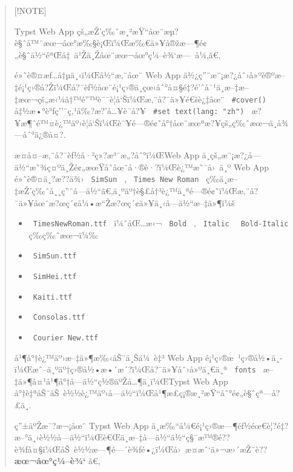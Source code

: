 

\begin{quote}
{[}!NOTE{]}

Typst Web App
çš„æŽ'ç‰ˆæ¸²æŸ``åœ¨æµ?è§ˆå™¨æœ¬åœ°æ‰§è¡Œï¼Œæ‰€ä»¥å®žæ---¶é¢„è§ˆä½``éªŒå‡~ä¹Žä¸Žåœ¨æœ¬åœ°ç¼--è¾`æ---~å¼‚ã€‚

é»˜è®¤æƒ\ldots å†µä¸‹ï¼Œå½``æ‚¨åœ¨ Web App
ä½¿ç''¨æ¨¡æ?¿åˆ›å»ºè®ºæ--‡é¡¹ç›®å?Žï¼Œå?¯èƒ½åœ¨é¡¹ç›®ä¸­çœ‹åˆ°å¤§é‡?é'ˆå¯¹ä¸­æ--‡æ--‡æœ¬çš„æ‹¼å†™é''™è¯¯è­¦å`Šï¼Œæ‚¨å?¯ä»¥é€šè¿‡åœ¨
\texttt{\ \#cover()\ } å‡½æ•°è°ƒç''¨ç‚¹å‰?æ?'å\ldots¥è¯­å?¥
\texttt{\ \#set\ text(lang:\ "zh")\ }
æ?¥æ¶ˆé™¤è¿™äº›è­¦å`Šï¼Œè¯¥é---®é¢˜å°†åœ¨æœªæ?¥çš„ç‰ˆæœ¬ä¸­å¾---åˆ°ä¿®å¤?.

æ­¤å¤--æ‚¨å?¯èƒ½å·²ç»?æ³¨æ„?åˆ°ï¼ŒWeb App
ä¸­çš„æ¨¡æ?¿å­---ä½``æ˜¾ç¤ºä¸Žé¢„æœŸå­˜åœ¨å·®è·?ï¼Œè¿™æ˜¯å›~ä¸º Web App
é»˜è®¤ä¸?æ??ä¾› \texttt{\ SimSun\ } , \texttt{\ Times\ New\ Roman\ }
ç­‰ä¸­æ--‡æŽ'ç‰ˆå¸¸ç''¨å­---ä½``ã€‚ä¸ºäº†è§£å†³è¿™ä¸ªé---®é¢˜ï¼Œæ‚¨å?¯ä»¥åœ¨æ?œç´¢å¼•æ``Žæ?œç´¢ä»¥ä¸‹å­---ä½``æ--‡ä»¶ï¼š

\begin{itemize}
\tightlist
\item
  \texttt{\ TimesNewRoman.ttf\ } ï¼ˆåŒ\ldots æ‹¬ \texttt{\ Bold\ } ,
  \texttt{\ Italic\ } \texttt{\ Bold-Italic\ } ç­‰ç‰ˆæœ¬ï¼‰
\item
  \texttt{\ SimSun.ttf\ }
\item
  \texttt{\ SimHei.ttf\ }
\item
  \texttt{\ Kaiti.ttf\ }
\item
  \texttt{\ Consolas.ttf\ }
\item
  \texttt{\ Courier\ New.ttf\ }
\end{itemize}

å¹¶å°†è¿™äº›æ--‡ä»¶æ‰‹åŠ¨ä¸Šä¼~è‡³ Web App
é¡¹ç›®æ~¹ç›®å½•ä¸­ï¼Œæˆ--ä¸ºäº†ç›®å½•æ•´æ´?ï¼Œå?¯ä»¥åˆ›å»ºä¸€ä¸ª
\texttt{\ fonts\ } æ--‡ä»¶å¤¹å¹¶å°†å­---ä½``ç½®äºŽå\ldots¶ä¸­ï¼ŒTypst Web
App å°†è‡ªåŠ¨åŠ~è½½è¿™äº›å­---ä½``ï¼Œå¹¶æ­£ç¡®æ¸²æŸ``åˆ°é¢„è§ˆçª---å?£ä¸­.

ç''±äºŽæ¯?æ¬¡åœ¨ Typst Web App
ä¸­æ‰``å¼€é¡¹ç›®æ---¶éƒ½éœ€è¦?é‡?æ--°ä¸‹è½½å­---ä½``ï¼Œè€Œä¸­æ--‡å­---ä½``ä½``ç§¯æ™®é??è¾ƒå¤§ï¼ŒåŠ~è½½æ---¶é---´è¾ƒé•¿ï¼Œå›~æ­¤æˆ`ä»¬æ›´æŽ¨è??
\textbf{æœ¬åœ°ç¼--è¾`} ã€‚
\end{quote}

